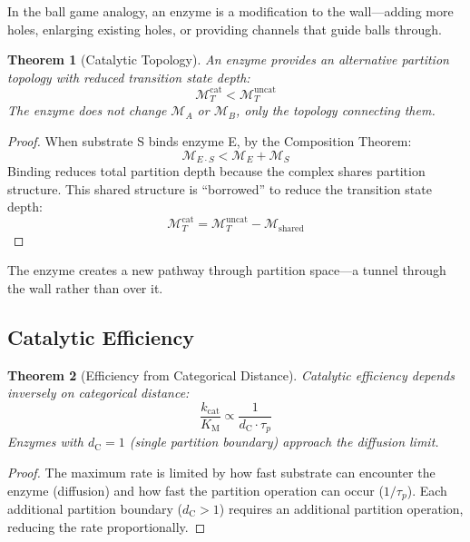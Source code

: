 ﻿\documentclass[twocolumn,10pt,a4paper]{article}
\newtheorem{theorem}{Theorem}[section]
\theoremstyle{definition}
\theoremstyle{remark}
\newcommand{\Depth}{\mathcal{M}}
\newcommand{\kcat}{k_{\mathrm{cat}}}
\newcommand{\Km}{K_{\mathrm{M}}}
\newcommand{\dC}{d_{\mathrm{C}}}
\begin{document}
In the ball game analogy, an enzyme is a modification to the wall---adding more holes, enlarging existing holes, or providing channels that guide balls through.

\begin{theorem}[Catalytic Topology]
\label{thm:catalysis}
An enzyme provides an alternative partition topology with reduced transition state depth:
\begin{equation}
    \Depth_T^{\mathrm{cat}} < \Depth_T^{\mathrm{uncat}}
\end{equation}
The enzyme does not change $\Depth_A$ or $\Depth_B$, only the topology connecting them.
\end{theorem}

\begin{proof}
When substrate S binds enzyme E, by the Composition Theorem:
\begin{equation}
    \Depth_{E \cdot S} < \Depth_E + \Depth_S
\end{equation}
Binding reduces total partition depth because the complex shares partition structure. This shared structure is ``borrowed'' to reduce the transition state depth:
\begin{equation}
    \Depth_T^{\mathrm{cat}} = \Depth_T^{\mathrm{uncat}} - \Depth_{\mathrm{shared}}
\end{equation}
\end{proof}

The enzyme creates a new pathway through partition space---a tunnel through the wall rather than over it.

\subsection{Catalytic Efficiency}

\begin{theorem}[Efficiency from Categorical Distance]
\label{thm:efficiency}
Catalytic efficiency depends inversely on categorical distance:
\begin{equation}
    \frac{\kcat}{\Km} \propto \frac{1}{\dC \cdot \tau_p}
\end{equation}
Enzymes with $\dC = 1$ (single partition boundary) approach the diffusion limit.
\end{theorem}

\begin{proof}
The maximum rate is limited by how fast substrate can encounter the enzyme (diffusion) and how fast the partition operation can occur ($1/\tau_p$). Each additional partition boundary ($\dC > 1$) requires an additional partition operation, reducing the rate proportionally.
\end{proof}
\end{document}
